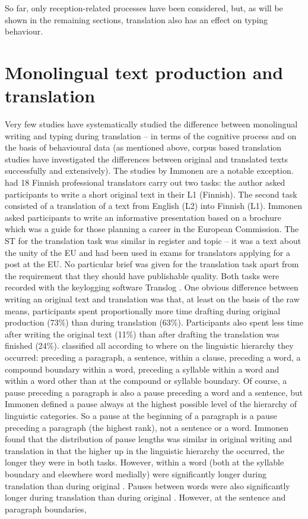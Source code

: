 \documentclass[output=paper]{LSP/langsci}
\begin{document}
So far, only reception-related processes have been considered, but, as will be shown in the remaining sections, translation also has an effect on typing behaviour.

\section{Monolingual text production and translation}

Very few studies have systematically studied the difference between monolingual writing and typing during translation -- in terms of the cognitive process and on the basis of behavioural data (as mentioned above, corpus based translation studies have investigated the differences between original and translated texts successfully and extensively). The studies by Immonen \citep{Immonen2010,Immonen2006, Immonen2011} are a notable exception. \citet{Immonen2006} had 18 Finnish professional translators carry out two tasks: the author asked participants to write a short original text in their L1 (Finnish). The second task consisted of a translation of a text from English (L2) into Finnish (L1). Immonen asked participants to write an informative presentation based on a brochure which was a guide for those planning a career in the European Commission. The ST for the translation task was similar in register and topic -- it was a text about the unity of the EU and had been used in exams for translators applying for a post at the EU. No particular brief was given for the translation task apart from the requirement that they should have publishable quality. Both tasks were recorded with the keylogging software Translog \citep{Jakobsen1999Translog}. One obvious difference between writing an original text and translation was that, at least on the basis of the raw means, participants spent proportionally more time drafting during original production (73\%) than during translation (63\%). Participants also spent less time  after writing the original text (11\%) than after drafting the translation was finished (24\%). \citet[323]{Immonen2006} classified all  according to where on the linguistic hierarchy they occurred: preceding a paragraph, a sentence, within a clause, preceding a word, a compound boundary within a word, preceding a syllable within a word and within a word other than at the compound or syllable boundary. Of course, a pause preceding a paragraph is also a pause preceding a word and a sentence, but Immonen defined a pause always at the highest possible level of the hierarchy of linguistic categories. So a pause at the beginning of a paragraph is a pause preceding a paragraph (the highest rank), not a sentence or a word. Immonen found that the distribution of pause lengths was similar in original writing and translation in that the higher up in the linguistic hierarchy the  occurred, the longer they were in both tasks. However,  within a word (both at the syllable boundary and elsewhere word medially) were significantly longer during translation than during original . Pauses between words were also significantly longer during translation than during original . However, at the sentence and paragraph boundaries,  
\end{document}
